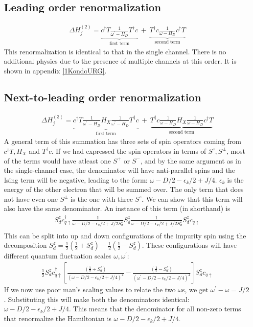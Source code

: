 \documentclass{revtex4-2}
\begin{document}
\subsection{Leading order renormalization}
\begin{align}
	\Delta H^{(2)}_j = \underbrace{c^\dagger T \frac{1}{\omega^\prime - H_D}T^\dagger c}_\text{first term}~+~\underbrace{T^\dagger c \frac{1}{\omega - H_D}c^\dagger T}_\text{second term}
\end{align}
This renormalization is identical to that in the single channel. There is no additional physics due to the presence of multiple channels at this order. It is shown in appendix \ref{1KondoURG}.

\subsection{Next-to-leading order renormalization}
\begin{align}
	\Delta H^{(3)}_j = \underbrace{c^\dagger T \frac{1}{\omega^\prime - H_D} H_X \frac{1}{\omega^\prime - H_D} T^\dagger c}_\text{first term} ~+~ \underbrace{T^\dagger c \frac{1}{\omega - H_D} H_X \frac{1}{\omega - H_D} c^\dagger T}_\text{second term}
\end{align}
A general term of this summation has three sets of spin operators coming from \(c^\dagger T, H_X\) and \(T^\dagger c\). If we had expressed the spin operators in terms of \(S^z, S^\pm\), most of the terms would have atleast one \(S^+\) or \(S^-\), and by the same argument as in the single-channel case, the denominator will have anti-parallel spins and the Ising term will be negative, leading to the form: \(\omega - D/2 - \epsilon_k/2 + J/4\). \(\epsilon_k\) is the energy of the other electron that will be summed over. The only term that does not have even one \(S^\pm\) is the one with three \(S^z\). We can show that this term will also have the same denominator. An instance of this term (in shorthand) is
\begin{align}
	S_d^z c^\dagger_{q \uparrow} \frac{1}{\omega - D/2 -\epsilon_k/2 + J/2 S_d^z} S_d^z \frac{1}{\omega - D/2 -\epsilon_k/2 + J/2 S_d^z} S_d^z c_{q \uparrow}\\
\end{align}
This can be split into up and down configurations of the impurity spin using the decomposition \(S_d^z = \frac{1}{2}\left(\frac{1}{2} + S_d^z\right) - \frac{1}{2}\left(\frac{1}{2} - S_d^z \right) \). These configurations will have different quantum fluctuation scales \(\omega, \omega^\prime\):
\begin{align}
	\frac{1}{2}S_d^z c^\dagger_{q \uparrow}\left[\frac{\left(\frac{1}{2} + S_d^z\right)}{\left(\omega - D/2 -\epsilon_k/2 + J/4\right)^2} - \frac{\left(\frac{1}{2} - S_d^z\right)}{\left(\omega^\prime - D/2 -\epsilon_k/2 - J/4\right)^2}\right]S_d^z c_{q \uparrow}
\end{align}
If we now use poor man's scaling values to relate the two \(\omega\)s, we get \(\omega^\prime - \omega = J/2\). Substituting this will make both the denominators identical: \(\omega - D/2 -\epsilon_k/2 + J/4\). This means that the denominator for all non-zero terms that renormalize the Hamiltonian is \(\omega - D/2 - \epsilon_k/2 + J/4\).
\end{document}
